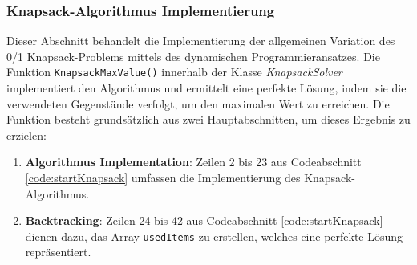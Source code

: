 \subsubsection{Knapsack-Algorithmus Implementierung}
Dieser Abschnitt behandelt die Implementierung der allgemeinen Variation des 0/1 Knapsack-Problems mittels des dynamischen
Programmieransatzes. Die Funktion \texttt{KnapsackMaxValue()} innerhalb der Klasse \textit{KnapsackSolver} implementiert
den Algorithmus und ermittelt eine perfekte Lösung, indem sie die verwendeten Gegenstände verfolgt, um den maximalen Wert
zu erreichen. Die Funktion besteht grundsätzlich aus zwei Hauptabschnitten, um dieses Ergebnis zu erzielen:
\begin{enumerate}
    \item \textbf{Algorithmus Implementation}: Zeilen 2 bis 23 aus Codeabschnitt \ref{code:startKnapsack} umfassen die
    Implementierung des Knapsack-Algorithmus.

    \item \textbf{Backtracking}: Zeilen 24 bis 42 aus Codeabschnitt \ref{code:startKnapsack} dienen dazu, das Array
    \texttt{usedItems} zu erstellen, welches eine perfekte Lösung repräsentiert.
\end{enumerate}

